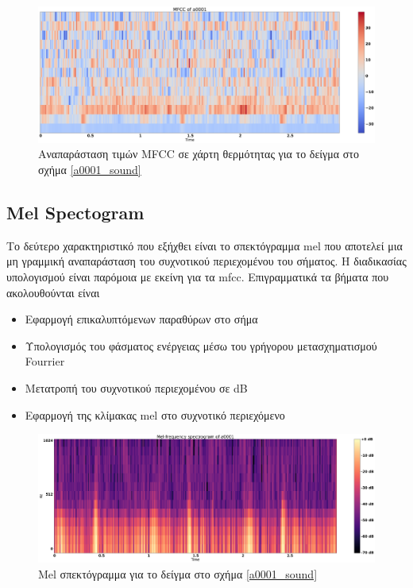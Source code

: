 \begin{figure}[H]
	\includegraphics[width=\textwidth]{../images/a0001_mfcc.png}
	\caption{Αναπαράσταση τιμών MFCC σε χάρτη θερμότητας για το δείγμα στο σχήμα
		\ref{a0001_sound}}
	\label{a0001_mfcc}
\end{figure}

\subsection{Mel Spectogram}

Το δεύτερο χαρακτηριστικό που εξήχθει είναι το σπεκτόγραμμα mel που αποτελεί
μια μη γραμμική αναπαράσταση του συχνοτικού περιεχομένου του σήματος. Η
διαδικασίας υπολογισμού είναι παρόμοια με εκείνη για τα mfcc. Επιγραμματικά τα
βήματα που ακολουθούνται είναι \cite{melspectogram}

\begin{itemize}
	\item Εφαρμογή επικαλυπτόμενων παραθύρων στο σήμα
	\item Υπολογισμός του φάσματος ενέργειας μέσω του γρήγορου μετασχηματισμού
	      Fourrier
	\item Μετατροπή του συχνοτικού περιεχομένου σε dB
	\item Εφαρμογή της κλίμακας mel στο συχνοτικό περιεχόμενο
\end{itemize}


\begin{figure}[H]
	\includegraphics[width=\textwidth]{../images/a0001_spectogram.png}
	\caption{Mel σπεκτόγραμμα για το δείγμα στο σχήμα \ref{a0001_sound}}
	\label{a0001_spectogram}
\end{figure}

